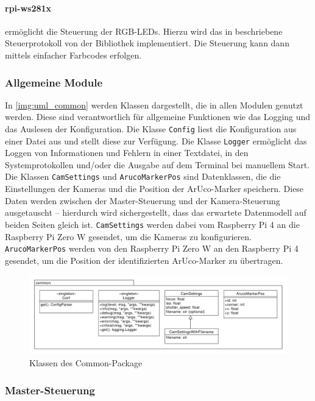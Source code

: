 \documentclass[./00PhotoBox.tex]{subfiles}
\begin{document}
\paragraph{rpi-ws281x}
\label{p:ws281x}
ermöglicht die Steuerung der RGB-LEDs. Hierzu wird das in \cite{ws2811} beschriebene Steuerprotokoll von der Bibliothek implementiert. Die Steuerung kann dann mittels einfacher Farbcodes erfolgen.

\subsubsection{Allgemeine Module}
In \autoref{img:uml_common} werden Klassen dargestellt, die in allen Modulen genutzt werden. Diese sind verantwortlich für allgemeine Funktionen wie das Logging und das Auslesen der Konfiguration. Die Klasse \texttt{Config} liest die Konfiguration aus einer Datei aus und stellt diese zur Verfügung. Die Klasse \texttt{Logger} ermöglicht das Loggen von Informationen und Fehlern in einer Textdatei, in den Systemprotokollen und/oder die Ausgabe auf dem Terminal bei manuellem Start. Die Klassen \texttt{CamSettings} und \texttt{ArucoMarkerPos} sind Datenklassen, die die Einstellungen der Kameras und die Position der ArUco-Marker speichern. Diese Daten werden zwischen der Master-Steuerung und der Kamera-Steuerung ausgetauscht -- hierdurch wird sichergestellt, dass das erwartete Datenmodell auf beiden Seiten gleich ist. \texttt{CamSettings} werden dabei vom Raspberry Pi 4 an die Raspberry Pi Zero W gesendet, um die Kameras zu konfigurieren. \texttt{ArucoMarkerPos} werden von den Raspberry Pi Zero W an den Raspberry Pi 4 gesendet, um die Position der identifizierten ArUco-Marker zu übertragen.

\begin{figure}
    \centering
    \includegraphics[width=1\textwidth]{./img/uml/uml_common_classdiagramm.pdf}
    \caption{Klassen des Common-Package} %
    \label{img:uml_common} %
\end{figure}


\subsubsection{Master-Steuerung}
\end{document}
